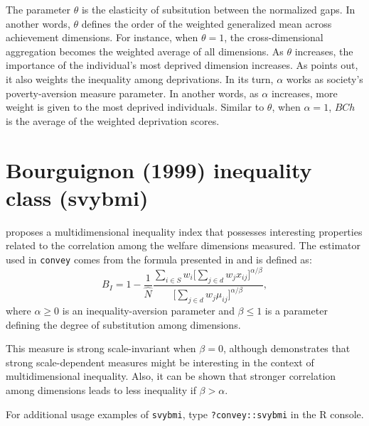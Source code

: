 \documentclass[]{book}
\theoremstyle{definition}
\theoremstyle{definition}
\theoremstyle{remark}
\begin{document}
The parameter \(\theta\) is the elasticity of subsitution between the
normalized gaps. In another words, \(\theta\) defines the order of the
weighted generalized mean across achievement dimensions. For instance,
when \(\theta = 1\), the cross-dimensional aggregation becomes the
weighted average of all dimensions. As \(\theta\) increases, the
importance of the individual's most deprived dimension increases. As
\citet{vega2009} points out, it also weights the inequality among
deprivations. In its turn, \(\alpha\) works as society's
poverty-aversion measure parameter. In another words, as \(\alpha\)
increases, more weight is given to the most deprived individuals.
Similar to \(\theta\), when \(\alpha = 1\), \(BCh\) is the average of
the weighted deprivation scores.

\section{Bourguignon (1999) inequality class
(svybmi)}\label{bourguignon-1999-inequality-class-svybmi}

\citet{bourguignon1999} proposes a multidimensional inequality index
that possesses interesting properties related to the correlation among
the welfare dimensions measured. The estimator used in \texttt{convey}
comes from the formula presented in \citet{lugo2007} and is defined as:
\[
B_{I} = 1 - \frac{1}{ \widehat{N} } \frac{ \sum_{ i \in S } w_i \bigg[ \sum_{ j \in d } w_j x_{ij} \bigg]^{ \alpha / \beta } }{ 
\bigg[ \sum_{ j \in d } w_j \mu_{ij} \bigg]^{ \alpha / \beta } },
\] where \(\alpha \geqslant 0\) is an inequality-aversion parameter and
\(\beta \leqslant 1\) is a parameter defining the degree of substitution
among dimensions.

This measure is strong scale-invariant when \(\beta = 0\), although
\citet{bourguignon1999} demonstrates that strong scale-dependent
measures might be interesting in the context of multidimensional
inequality. Also, it can be shown that stronger correlation among
dimensions leads to less inequality if \(\beta > \alpha\).

For additional usage examples of \texttt{svybmi}, type
\texttt{?convey::svybmi} in the R console.


\end{document}
